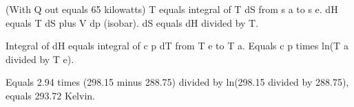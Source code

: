 (With Q out equals 65 kilowatts)  
T equals integral of T dS from s a to s e.  
dH equals T dS plus V dp (isobar).  
dS equals dH divided by T.  

Integral of dH equals integral of c p dT from T e to T a.  
Equals c p times ln(T a divided by T e).  

Equals 2.94 times (298.15 minus 288.75) divided by ln(298.15 divided by 288.75), equals 293.72 Kelvin.